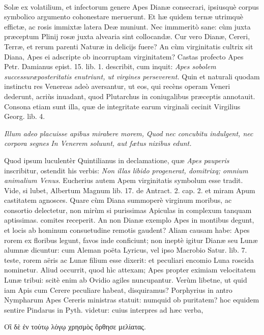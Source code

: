 \documentclass[a4paper, 11pt, oneside, polutonikogreek, latin]{article}
\begin{document}
\paragraph{}
Solæ ex volatilium, et infectorum genere Apes Dianæ consecrari, ipsiusquè corpus symbolico argumento cohonestare meruerunt. Et hæ quidem ternæ utrimquè effictæ, ac rosis immixtæ latera Deæ muniunt. Nec immmeritò sane: cùm juxta præceptum Plinij rosæ juxta alvearia sint collocandæ. Cur vero Dianæ, Cereri, Terræ, et rerum parenti Naturæ in delicijs fuere? An cùm virginitatis cultrix sit Diana, Apes ei adscripte ob incorruptam virginitatem? Castas profecto Apes Petr. Damianus epist. 15. lib. 1. describit, cum inquit: \emph{Apes sobolem successuræposteritatis enutriunt, ut virgines perseverent.} Quin et naturali quodam instinctu res Venereas adeò aversantur, ut eos, qui recèns operam Veneri dederunt, acriùs inuadant, quod Plutarchus in coniugalibus præceptis annotauit. Consona etiam sunt illa, quæ de integritate earum virginali cecinit Virgilius Georg. lib. 4.

\emph{Illum adeo placuisse apibus mirabere morem,}
\emph{Quod nec concubitu indulgent, nec corpora segnes}
\emph{In Venerem soluunt, aut fætus nixibus edunt.}

Quod ipsum luculentèr Quintilianus in declamatione, quæ \emph{Apes pauperis} inscribitur, ostendit his verbis: \emph{Non illas libido progenerat, domitrixq; omnium animalium Venus}. Eucherius autem Apem virginitatis symbolum esse tradit. Vide, si lubet, Albertum Magnum lib. 17. de Antract. 2. cap. 2. et miram Apum castitatem agnosces. Quare cùm Diana summoperè virginum moribus, ac consortio delectetur, non mirùm si purissimas Apiculas in complexum tanquam aptissimas. comites receperit. An non Dianæ exemplo Apes in montibus degunt, et locis ab hominum consuetudine remotis gaudent? Aliam causam habe: Apes rorem ex floribus legunt, favos inde conficiunt; non ineptè igitur Dianæ seu Lunæ alumnæ dicuntur: cum Aleman poëta Lyricus, vel ipso Macrobio Satur. lib. 7. teste, rorem aëris ac Lunæ filium esse dixerit: et peculiari encomio Luna roscida nominetur. Aliud occurrit, quod hìc attexam; Apes propter eximiam velocitatem Lunæ tribui: scitè enim ab Ovidio agiles nuncupantur. Verùm libetne, ut quid iam Apis cum Cerere peculiare habeat, disquiramus? Porphyrius in antro Nympharum Apes Cereris ministras statuit: numquid ob puritatem? hoc equidem sentire Pindarus in Pyth. videtur: cuius interpres ad hæc verba,

Οἳ δὲ ἐν τούτῳ λόγῳ χρησμὸς ὄρθησε μελίατας.
\end{document}
